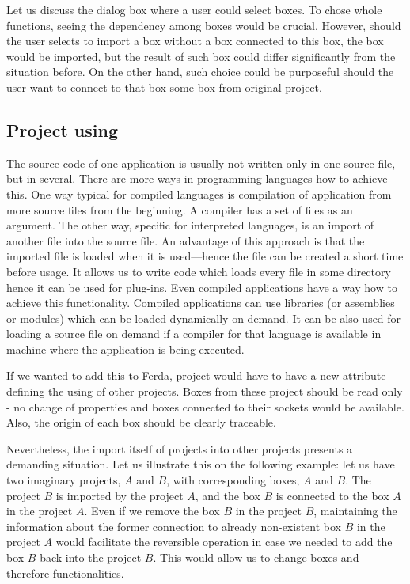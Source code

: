 \documentclass[a4paper,12pt]{book}
\begin{document}
Let us discuss the dialog box where a user could select boxes. To chose whole functions, seeing the dependency among boxes would be crucial. However, should the user selects to import a box without a box connected to this box, the box would be imported, but the result of such box could differ significantly from the situation before. On the other hand, such choice could be purposeful should the user want to connect to that box some box from original project.

\subsection{Project using}
The source code of one application is usually not written only in one source file, but in several. There are more ways in programming languages how to achieve this. One way typical for compiled languages is compilation of application from more source files from the beginning. A compiler has a set of files as an argument. The other way, specific for interpreted languages, is an import of another file into the source file. An advantage of this approach is that the imported file is loaded when it is used---hence the file can be created a short time before usage. It allows us to write code which loads every file in some directory hence it can be used for plug-ins. Even compiled applications have a way how to achieve this functionality. Compiled applications can use libraries (or assemblies or modules) which can be loaded dynamically on demand. It can be also used for loading a source file on demand if a compiler for that language is available in machine where the application is being executed.

If we wanted to add this to Ferda, project would have to have a new attribute defining the using of other projects. Boxes from these project should be read only - no change of properties and boxes connected to their sockets would be available. Also, the origin of each box should be clearly traceable.

Nevertheless, the import itself of projects into other projects presents a demanding situation. Let us illustrate this on the following example: let us have two imaginary projects, $A$ and $B$, with corresponding boxes, $A$ and $B$. The project $B$ is imported by the project $A$, and the box $B$ is connected to the box $A$ in the project $A$. Even if we remove the box $B$ in the project $B$, maintaining the information about the former connection to already non-existent box $B$ in the project $A$ would facilitate the reversible operation in case we needed to add the box $B$ back into the project $B$. This would allow us to change boxes and therefore functionalities.
\end{document}
